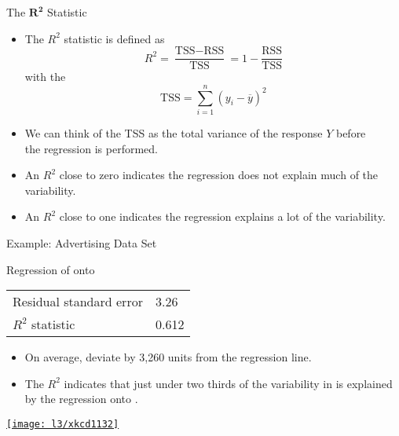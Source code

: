\documentclass[mathserif, aspectratio=169]{beamer}
\begin{document}
\begin{frame}{The $\bm{R^2}$ Statistic}
	\begin{itemize}
		\item The $R^2$ statistic is defined as
			\[ R^2 = \frac{\text{TSS} - \text{RSS}}{\text{TSS}} = 1 - \frac{\text{RSS}}{\text{TSS}} \]
			with the   
			\[ \text{TSS} = \sum_{i=1}^{n} (y_i - \overline{y})^2 \]
		\item We can think of the TSS as the total variance of the response $Y$ before\\
			the regression is performed.
		\item An $R^2$ close to zero indicates the regression does not explain much of the variability.
		\item An $R^2$ close to one indicates the regression explains a lot of the variability.
	\end{itemize}
\end{frame}

\begin{frame}{Example: Advertising Data Set}
	\begin{popblock}{0.5\textwidth}{Regression of  onto }
		\begin{tabular}[h]{ll}
			Residual standard error & 3.26 \\
			$R^2$ statistic & 0.612 \\
		\end{tabular}
	\end{popblock}
	\begin{itemize}
		\item On average,  deviate by 3,260 units from the regression line.
		\item The $R^2$ indicates that just under two thirds of the variability in  is explained\\
			by the regression onto .
	\end{itemize}
\end{frame}

\begin{frame}[plain]
	\begin{center}
		\href{https://xkcd.com/1132/}{\texttt{[image: l3/xkcd1132]}}
	\end{center}
\end{frame}
\end{document}
